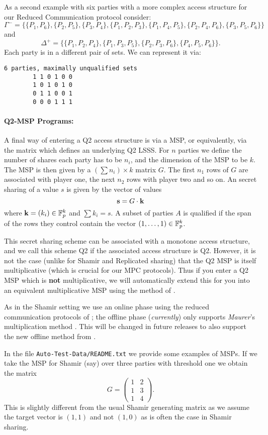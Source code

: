 \noindent
As a second example with six parties with a more complex
access structure for our Reduced Communication protocol consider:
\[\Gamma^- = \{\{P_1, P_6\}, \{P_2, P_5\}, \{P_3, P_4\}, \{P_1, P_2, P_3\}, \{P_1,
  P_4, P_5\}, \{P_2, P_4, P_6\}, \{P_3, P_5, P_6\}\}\]
and
\[\Delta^+ = \{\{P_1, P_2, P_4\}, \{P_1, P_3, P_5\}, \{P_2, P_3, P_6\}, \{P_4, P_5, P_6\}\}.\]
Each party is in a different pair of sets.  We can represent it via:
\begin{verbatim}
6 parties, maximally unqualified sets
        1 1 0 1 0 0
        1 0 1 0 1 0
        0 1 1 0 0 1
        0 0 0 1 1 1
\end{verbatim}

\paragraph{Q2-MSP Programs:}
A final way of entering a Q2 access structure is via a MSP, or equivalently,
via the matrix which defines an underlying Q2 LSSS.
For $n$ parties we define the number of shares each party has to be 
$n_i$, and the dimension of the MSP to be $k$. The MSP is then given
by a $(\sum n_i) \times k$ matrix $G$.
The first $n_1$ rows of $G$ are associated with player one, the
next $n_2$ rows with player two and so on.
An secret sharing of a value $s$ is given by the vector of values
\[ \mathbf{s} = G \cdot \mathbf{k} \]
where $\mathbf{k} = (k_i) \in {\mathbb{F}}_p^k$ and $\sum k_i =s$.
A subset of parties $A$ is qualified if the span of the rows they control
contain the vector $(1,\ldots,1) \in {\mathbb{F}}_p^k$.

This secret sharing scheme can be associated with a monotone
access structure, and we call this scheme Q2 if the associated
access structure is Q2.
However, it is not the case (unlike for Shamir and Replicated sharing)
that the Q2 MSP is itself multiplicative (which is crucial for
our MPC protocols).
Thus if you enter a Q2 MSP which is {\bf not} multiplicative, we
will automatically extend this for you into an equivalent multiplicative MSP
using the method of \cite{CDM00}.

As in the Shamir setting we use an online phase using the reduced communication
protocols of \cite{KRSW}; 
the offline phase ({\em currently}) only supports {\em Maurer}'s multiplication method
\cite{Maurer}.
This will be changed in future releases to also support the new offline method from
\cite{SW18}.

In the file \verb+Auto-Test-Data/README.txt+ we provide some examples
of MSPs. If we take the MSP for Shamir (say) over three parties with threshold
one we obtain the matrix
\[ 
   G = \left( \begin{array}{cc}
      1 & 2 \\ 1 & 3 \\ 1 & 4 
       \end{array} \right).
\]
This is slightly different from the usual Shamir generating matrix
as we assume the target vector is $(1,1)$ and not $(1,0)$ as is often
the case in Shamir sharing.


